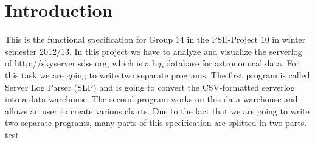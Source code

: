 \section{Introduction}
This is the functional specification for Group 14 in the PSE-Project 10 in winter semester 2012/13. 
In this project we have to analyze and visualize the serverlog of http://skyserver.sdss.org, which is a big database for astronomical 
data. For this task we are going to write two separate programs. The first program is called Server Log Parser (SLP)
and is going to convert the CSV-formatted serverlog into a data-warehouse. The second program works on this data-warehouse
and allows an user to create various charts. Due to the fact that we are going to write two separate programs, many parts
of this specification are splitted in two parts. 
\newline
\newline
test
